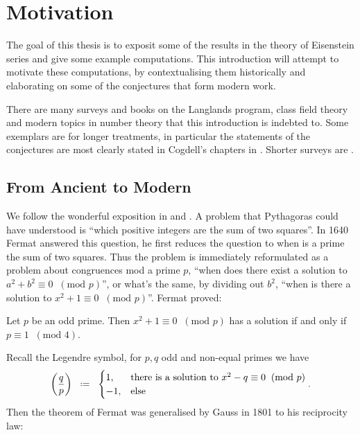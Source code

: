 \section*{Motivation}
The goal of this thesis is to exposit some of the results in the theory of Eisenstein series and give some example computations. This introduction will attempt to motivate these computations, by contextualising them historically and elaborating on some of the conjectures that form modern work. 

There are many surveys and books on the Langlands program, class field theory and modern topics in number theory that this introduction is indebted to. Some exemplars are \cite{fleigEisensteinSeriesAutomorphic2016, bumpIntroductionLanglandsProgram2004} for longer treatments, in particular the statements of the conjectures are most clearly stated in Cogdell's chapters in \cite{bumpIntroductionLanglandsProgram2004}. Shorter surveys are \cite{gelbartElementaryIntroductionLanglands1984, langlandsFunctorialityTheoryAutomorphic, langlandsRepresentationTheoryIts1989, arthurAUTOMORPHICREPRESENTATIONSNUMBER1981}.

\subsection{From Ancient to Modern}
We follow the wonderful exposition in \cite{weinsteinReciprocityLawsGalois2015} and \cite{conradHISTORYCLASSFIELD}. A problem that Pythagoras could have understood is ``which positive integers are the sum of two squares''. In 1640 Fermat answered this question, he first reduces the question to when is a prime the sum of two squares. Thus the problem is immediately reformulated as a problem about congruences mod a prime \(p\), ``when does there exist a solution to \(a^2  +b^2 \equiv 0 \;\;(\text{mod }p) \)'', or what's the same, by dividing out \(b^2\), ``when is there a solution to \(x^2 + 1 \equiv 0 \;\;(\text{mod }p)\)''. Fermat proved:
\begin{Theorem}
	Let \(p\) be an odd prime. Then \(x^2 + 1 \equiv 0 \;\;(\text{mod }p)\) has a solution if and only if \(p\equiv 1 \;\;(\text{mod }4) \).
\end{Theorem}

Recall the Legendre symbol, for \(p, q\) odd and non-equal primes we have 
\[\left(\frac{q}{p}\right) \defeq \begin{cases}
	1 , & \text{there is a solution to }x^2 - q \equiv 0 \;\;(\text{mod }p)\\
	-1 , & \text{else}
\end{cases}.\]
Then the theorem of Fermat was generalised by Gauss in 1801 to his reciprocity law:

